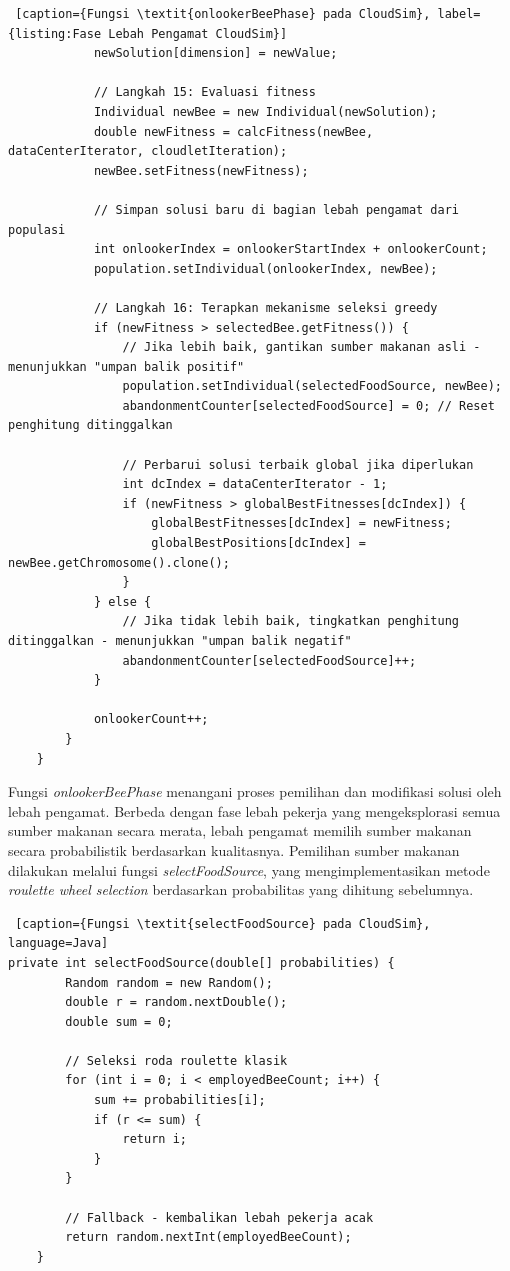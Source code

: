 \begin{lstlisting} [caption={Fungsi \textit{onlookerBeePhase} pada CloudSim}, label={listing:Fase Lebah Pengamat CloudSim}]
            newSolution[dimension] = newValue;
            
            // Langkah 15: Evaluasi fitness
            Individual newBee = new Individual(newSolution);
            double newFitness = calcFitness(newBee, dataCenterIterator, cloudletIteration);
            newBee.setFitness(newFitness);
            
            // Simpan solusi baru di bagian lebah pengamat dari populasi
            int onlookerIndex = onlookerStartIndex + onlookerCount;
            population.setIndividual(onlookerIndex, newBee);
            
            // Langkah 16: Terapkan mekanisme seleksi greedy
            if (newFitness > selectedBee.getFitness()) {
                // Jika lebih baik, gantikan sumber makanan asli - menunjukkan "umpan balik positif"
                population.setIndividual(selectedFoodSource, newBee);
                abandonmentCounter[selectedFoodSource] = 0; // Reset penghitung ditinggalkan
                
                // Perbarui solusi terbaik global jika diperlukan
                int dcIndex = dataCenterIterator - 1;
                if (newFitness > globalBestFitnesses[dcIndex]) {
                    globalBestFitnesses[dcIndex] = newFitness;
                    globalBestPositions[dcIndex] = newBee.getChromosome().clone();
                }
            } else {
                // Jika tidak lebih baik, tingkatkan penghitung ditinggalkan - menunjukkan "umpan balik negatif"
                abandonmentCounter[selectedFoodSource]++;
            }
            
            onlookerCount++;
        }
    }
\end{lstlisting}

Fungsi \textit{onlookerBeePhase} menangani proses pemilihan dan modifikasi solusi oleh lebah pengamat. Berbeda dengan fase lebah pekerja yang mengeksplorasi semua sumber makanan secara merata, lebah pengamat memilih sumber makanan secara probabilistik berdasarkan kualitasnya. Pemilihan sumber makanan dilakukan melalui fungsi \textit{selectFoodSource}, yang mengimplementasikan metode \textit{roulette wheel selection} berdasarkan probabilitas yang dihitung sebelumnya.

\begin{lstlisting} [caption={Fungsi \textit{selectFoodSource} pada CloudSim}, language=Java]
private int selectFoodSource(double[] probabilities) {
        Random random = new Random();
        double r = random.nextDouble();
        double sum = 0;
        
        // Seleksi roda roulette klasik
        for (int i = 0; i < employedBeeCount; i++) {
            sum += probabilities[i];
            if (r <= sum) {
                return i;
            }
        }
        
        // Fallback - kembalikan lebah pekerja acak
        return random.nextInt(employedBeeCount);
    }
\end{lstlisting}

